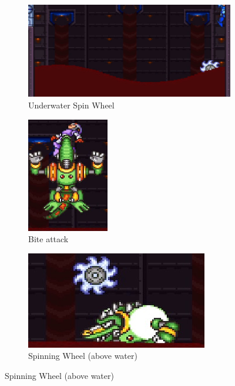 \begin{figure}[htp]
	\centering
	\begin{subfigure}{\linewidth}
		\centering
		\includegraphics[width=0.9\linewidth]{figures/X2/Wheel_gator/Gator_Spinning_wheel.png}
		\caption{Underwater Spin Wheel}
	\end{subfigure}
	\begin{subfigure}{0.45\linewidth}
		\centering
		\includegraphics[height=5cm]{figures/X2/Wheel_gator/Gator_bite.png}
		\caption{Bite attack}
	\end{subfigure}
	\begin{subfigure}{0.45\linewidth}
		\centering
		\includegraphics[width=\linewidth]{figures/X2/Wheel_gator/Gator_spinning_wheel_2.png}
		\caption{Spinning Wheel (above water)}
	\end{subfigure}
\end{figure}


